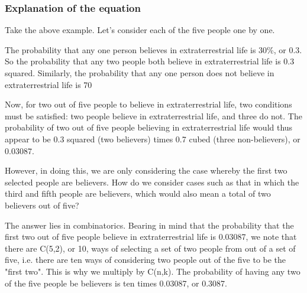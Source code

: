 \subsubsection{Explanation of the equation}
Take the above example. Let's consider each of the five people one by one.

The probability that any one person believes in extraterrestrial life is 30\%, or 0.3. So the probability that any two people both believe in extraterrestrial life is 0.3 squared. Similarly, the probability that any one person does not believe in extraterrestrial life is 70%

Now, for two out of five people to believe in extraterrestrial life, two conditions must be satisfied: two people believe in extraterrestrial life, and three do not. The probability of two out of five people believing in extraterrestrial life would thus appear to be 0.3 squared (two believers) times 0.7 cubed (three non-believers), or 0.03087.

However, in doing this, we are only considering the case whereby the first two selected people are believers. How do we consider cases such as that in which the third and fifth people are believers, which would also mean a total of two believers out of five?

The answer lies in combinatorics. Bearing in mind that the probability that the first two out of five people believe in extraterrestrial life is 0.03087, we note that there are C(5,2), or 10, ways of selecting a set of two people from out of a set of five, i.e. there are ten ways of considering two people out of the five to be the "first two". This is why we multiply by C(n,k). The probability of having any two of the five people be believers is ten times 0.03087, or 0.3087.
